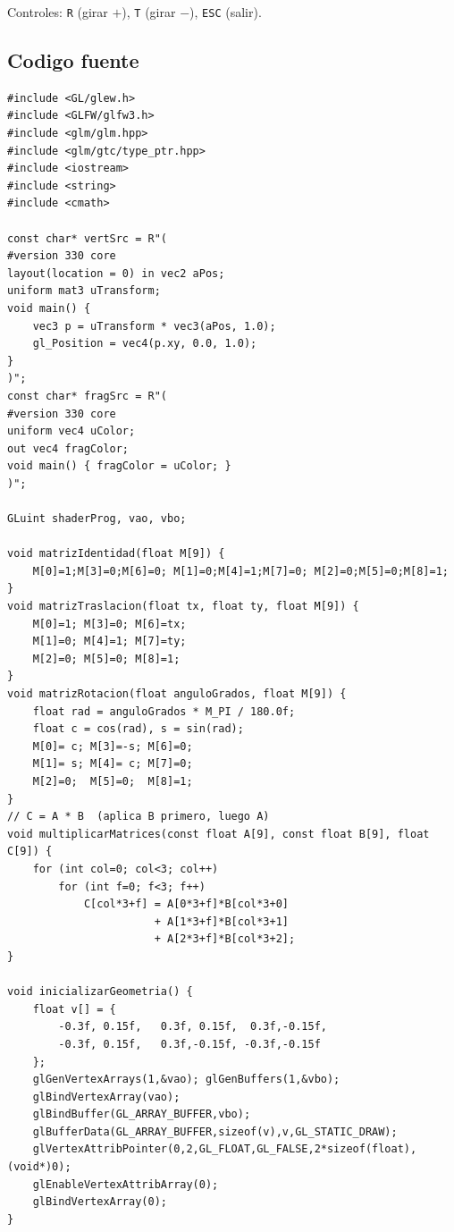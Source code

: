 \documentclass[12pt,a4paper]{article}
\begin{document}
Controles: \texttt{R} (girar $+$), \texttt{T} (girar $-$), \texttt{ESC} (salir).

\subsection{Codigo fuente}

\begin{lstlisting}[caption={actividadRectangulo.cpp}]
#include <GL/glew.h>
#include <GLFW/glfw3.h>
#include <glm/glm.hpp>
#include <glm/gtc/type_ptr.hpp>
#include <iostream>
#include <string>
#include <cmath>

const char* vertSrc = R"(
#version 330 core
layout(location = 0) in vec2 aPos;
uniform mat3 uTransform;
void main() {
    vec3 p = uTransform * vec3(aPos, 1.0);
    gl_Position = vec4(p.xy, 0.0, 1.0);
}
)";
const char* fragSrc = R"(
#version 330 core
uniform vec4 uColor;
out vec4 fragColor;
void main() { fragColor = uColor; }
)";

GLuint shaderProg, vao, vbo;

void matrizIdentidad(float M[9]) {
    M[0]=1;M[3]=0;M[6]=0; M[1]=0;M[4]=1;M[7]=0; M[2]=0;M[5]=0;M[8]=1;
}
void matrizTraslacion(float tx, float ty, float M[9]) {
    M[0]=1; M[3]=0; M[6]=tx;
    M[1]=0; M[4]=1; M[7]=ty;
    M[2]=0; M[5]=0; M[8]=1;
}
void matrizRotacion(float anguloGrados, float M[9]) {
    float rad = anguloGrados * M_PI / 180.0f;
    float c = cos(rad), s = sin(rad);
    M[0]= c; M[3]=-s; M[6]=0;
    M[1]= s; M[4]= c; M[7]=0;
    M[2]=0;  M[5]=0;  M[8]=1;
}
// C = A * B  (aplica B primero, luego A)
void multiplicarMatrices(const float A[9], const float B[9], float C[9]) {
    for (int col=0; col<3; col++)
        for (int f=0; f<3; f++)
            C[col*3+f] = A[0*3+f]*B[col*3+0]
                       + A[1*3+f]*B[col*3+1]
                       + A[2*3+f]*B[col*3+2];
}

void inicializarGeometria() {
    float v[] = {
        -0.3f, 0.15f,   0.3f, 0.15f,  0.3f,-0.15f,
        -0.3f, 0.15f,   0.3f,-0.15f, -0.3f,-0.15f
    };
    glGenVertexArrays(1,&vao); glGenBuffers(1,&vbo);
    glBindVertexArray(vao);
    glBindBuffer(GL_ARRAY_BUFFER,vbo);
    glBufferData(GL_ARRAY_BUFFER,sizeof(v),v,GL_STATIC_DRAW);
    glVertexAttribPointer(0,2,GL_FLOAT,GL_FALSE,2*sizeof(float),(void*)0);
    glEnableVertexAttribArray(0);
    glBindVertexArray(0);
}


\end{lstlisting}
\end{document}
